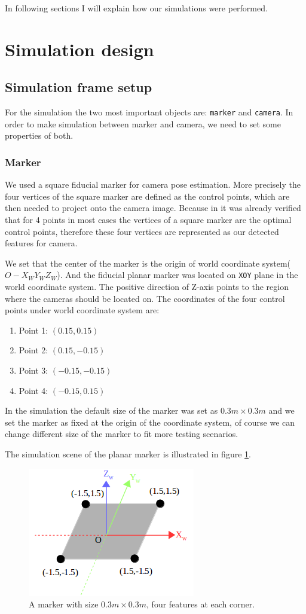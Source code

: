 In following sections I will explain how our simulations were performed.

\section{Simulation design}
\subsection{Simulation frame setup}

For the simulation the two most important objects are: \texttt{marker} and \texttt{camera}. 
In order to make simulation between marker and camera, we need to set some properties of both.
\subsubsection{Marker}
We used a square fiducial marker for camera pose estimation. More precisely the four vertices of the square marker are defined as the control points, which are then needed to project onto the camera image. Because in \cite{dynamic_markers} it was already verified that for 4 points in most cases the vertices of a square marker are the optimal control points, therefore these four vertices are represented as our detected features for camera.

We set that the center of the marker is the origin of world coordinate system($O-X_W Y_W Z_W$). And the fiducial planar marker was located on \texttt{XOY} plane in the world coordinate system. The positive direction of Z-axis points to the region where the cameras should be located on. The coordinates of the four control points under world coordinate system are:
\begin{enumerate}
\item Point 1: $(0.15,0.15)$
\item Point 2: $(0.15,-0.15)$
\item Point 3: $(-0.15,-0.15)$
\item Point 4: $(-0.15,0.15)$
\end{enumerate}
In the simulation the default size of the marker was set as $0.3m \times 0.3m$ and we set the marker as fixed at the origin of the coordinate system, of course we can change different size of the marker to fit more testing scenarios. 

The simulation scene of the planar marker is illustrated in figure \ref{fig:marker}.
\begin{figure}[H]
\centering
\includegraphics[scale=0.5]{./fig/marker.png}
\caption{A marker with size $0.3m \times 0.3m$, four features at each corner.}  
\label{fig:marker}
\end{figure}

